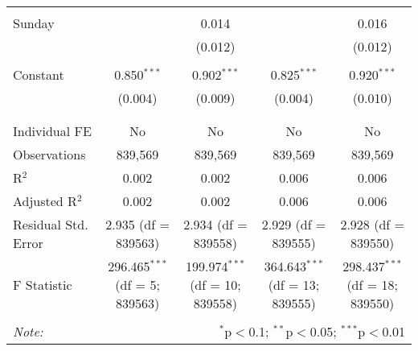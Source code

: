 \documentclass[
]{article}
\begin{document}
\begin{table}[!htbp]
{\begin{tabular}{@{\extracolsep{5pt}}lcccc}
  & & & & \\ 
 Sunday &  & 0.014 &  & 0.016 \\ 
  &  & (0.012) &  & (0.012) \\ 
  & & & & \\ 
 Constant & 0.850$^{***}$ & 0.902$^{***}$ & 0.825$^{***}$ & 0.920$^{***}$ \\ 
  & (0.004) & (0.009) & (0.004) & (0.010) \\ 
  & & & & \\ 
\hline \\[-1.8ex] 
Individual FE & No & No & No & No \\ 
Observations & 839,569 & 839,569 & 839,569 & 839,569 \\ 
R$^{2}$ & 0.002 & 0.002 & 0.006 & 0.006 \\ 
Adjusted R$^{2}$ & 0.002 & 0.002 & 0.006 & 0.006 \\ 
Residual Std. Error & 2.935 (df = 839563) & 2.934 (df = 839558) & 2.929 (df = 839555) & 2.928 (df = 839550) \\ 
F Statistic & 296.465$^{***}$ (df = 5; 839563) & 199.974$^{***}$ (df = 10; 839558) & 364.643$^{***}$ (df = 13; 839555) & 298.437$^{***}$ (df = 18; 839550) \\ 
\hline 
\hline \\[-1.8ex] 
\textit{Note:}  & \multicolumn{4}{r}{$^{*}$p$<$0.1; $^{**}$p$<$0.05; $^{***}$p$<$0.01} \\ 
\end{tabular}
} 
\end{table} 
\newpage
\end{document}

